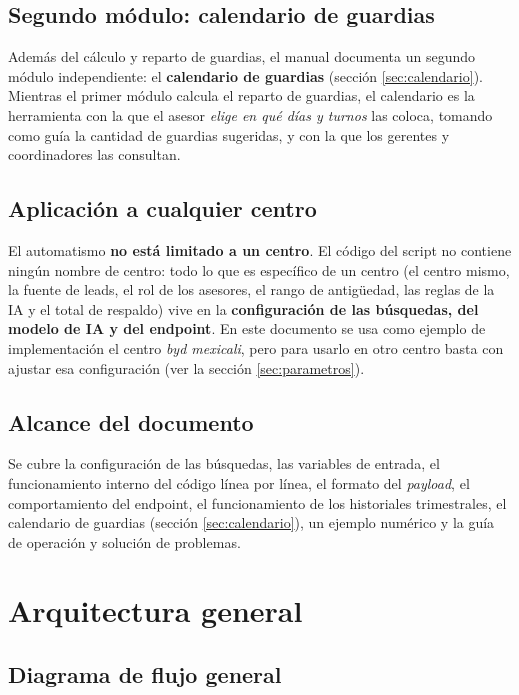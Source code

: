 \documentclass[11pt,a4paper]{article}
\begin{document}
\subsection{Segundo módulo: calendario de guardias}
Además del cálculo y reparto de guardias, el manual documenta un segundo módulo independiente: el \textbf{calendario de guardias} (sección \ref{sec:calendario}). Mientras el primer módulo calcula el reparto de guardias, el calendario es la herramienta con la que el asesor \emph{elige en qué días y turnos} las coloca, tomando como guía la cantidad de guardias sugeridas, y con la que los gerentes y coordinadores las consultan.

\subsection{Aplicación a cualquier centro}
El automatismo \textbf{no está limitado a un centro}. El código del script no contiene ningún nombre de centro: todo lo que es específico de un centro (el centro mismo, la fuente de leads, el rol de los asesores, el rango de antigüedad, las reglas de la IA y el total de respaldo) vive en la \textbf{configuración de las búsquedas, del modelo de IA y del endpoint}. En este documento se usa como ejemplo de implementación el centro \emph{byd mexicali}, pero para usarlo en otro centro basta con ajustar esa configuración (ver la sección \ref{sec:parametros}).

\subsection{Alcance del documento}
Se cubre la configuración de las búsquedas, las variables de entrada, el funcionamiento interno del código línea por línea, el formato del \emph{payload}, el comportamiento del endpoint, el funcionamiento de los historiales trimestrales, el calendario de guardias (sección \ref{sec:calendario}), un ejemplo numérico y la guía de operación y solución de problemas.

\section{Arquitectura general}

\subsection{Diagrama de flujo general}
\end{document}
